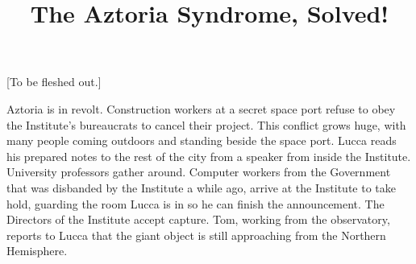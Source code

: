 \documentclass[11pt]{article}
\begin{document}
\ttfamily
\title{The Aztoria Syndrome, Solved!}
\maketitle

[To be fleshed out.]

Aztoria is in revolt. 
Construction workers at a secret space port refuse to obey the Institute's bureaucrats to cancel their project.
This conflict grows huge, with many people coming outdoors and standing beside the space port.
Lucca reads his prepared notes to the rest of the city from a speaker from inside the Institute.
University professors gather around.
Computer workers from the Government that was disbanded by the Institute a while ago, arrive at the Institute to take hold, guarding the room Lucca is in so he can finish the announcement.
The Directors of the Institute accept capture.
Tom, working from the observatory, reports to Lucca that the giant object is still approaching from the Northern Hemisphere. 
\end{document}
